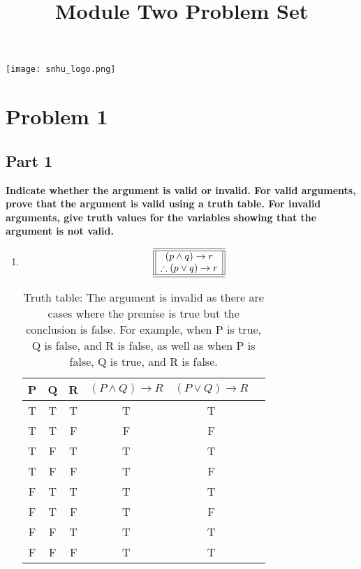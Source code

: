 \documentclass{amsart}
\theoremstyle{definition}
\theoremstyle{remark}
\numberwithin{equation}{section}
\begin{document}
\title{Module Two Problem Set}

\maketitle
\texttt{[image: snhu\_logo.png]}

\section*{Problem 1}
\subsection*{Part 1}
\textbf{Indicate whether the argument is valid or invalid. For valid arguments, prove that the argument is valid using a truth table. For invalid arguments, give truth values for the variables showing that the argument is not valid.}
\begin{enumerate}
    \item 
    \[
    \begin{array}{||c||}
    \hline \hline
    (p \land q) \to r \\
    \therefore (p \lor q) \to r \\
    \hline \hline
    \end{array}
    \]
    \begin{table}[h]
    \centering
    \begin{tabular}{cccccc}
    \toprule
    P & Q & R & $(P \land Q) \rightarrow R$ & $(P \lor Q) \rightarrow R$ \\
    \midrule
    T & T & T & T                           & T                          \\
    T & T & F & F                           & F                          \\
    T & F & T & T                           & T                          \\
    T & F & F & T                           & F                          \\
    F & T & T & T                           & T                          \\
    F & T & F & T                           & F                          \\
    F & F & T & T                           & T                          \\
    F & F & F & T                           & T                          \\
    \bottomrule
    \end{tabular}
    \caption{Truth table: The argument is invalid as there are cases where the premise is true but the conclusion is false. For example, when P is true, Q is false, and R is false, as well as when P is false, Q is true, and R is false.}
    \label{tab:truth_table_part1}
    \end{table}
\end{enumerate}
\end{document}
